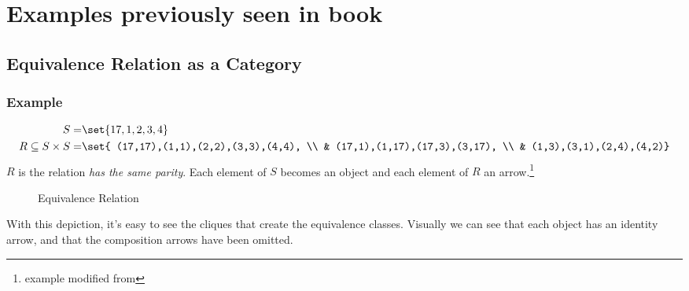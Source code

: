 \section{Examples previously seen in book}
\subsection{Equivalence Relation as a Category}
\subsubsection{Example}
\begin{align*}
	S=                     & \set{17, 1, 2, 3, 4}         \\
	R\subseteq S\times S = & \set{
	(17,17),(1,1),(2,2),(3,3),(4,4),                      \\
	                       & (17,1),(1,17),(17,3),(3,17), \\
	                       & (1,3),(3,1),(2,4),(4,2)}
\end{align*}
$R$ is the relation \emph{has the same parity}. Each element of $S$ becomes an object
and each element of $R$ an arrow.\footnote{example modified from\cite{hammack2020}}
\begin{figure}[H]
	\begin{center}
		
	\end{center}
	\caption{Equivalence Relation}
\end{figure}
With this depiction, it's easy to see the cliques that create the
equivalence classes. Visually we can see that each object has an identity arrow,
and that the composition arrows have been omitted.

